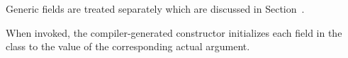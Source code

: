 Generic fields are treated separately
which are discussed in Section~.

When invoked, the compiler-generated constructor initializes each field in the class to the
value of the corresponding actual argument.  

%
%

% 

